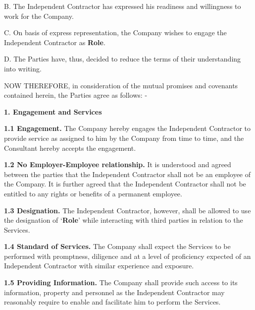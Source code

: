 \documentclass[12pt]{article}
\begin{document}
\vspace{0.5em}
\noindent
B. The Independent Contractor has expressed his readiness and willingness to work for the Company.

\vspace{0.5em}
\noindent
C. On basis of express representation, the Company wishes to engage the Independent Contractor as \textbf{{{Role}}}.

\vspace{0.5em}
\noindent
D. The Parties have, thus, decided to reduce the terms of their understanding into writing.

\vspace{1em}
\noindent
NOW THEREFORE, in consideration of the mutual promises and covenants contained herein, the Parties agree as follows: -

\vspace{1em}
\noindent
\textbf{1. Engagement and Services}

\vspace{0.5em}
\noindent
\textbf{1.1 Engagement.} The Company hereby engages the Independent Contractor to provide service as assigned to him by the Company from time to time, and the Consultant hereby accepts the engagement.

\vspace{0.5em}
\noindent
\textbf{1.2 No Employer-Employee relationship.} It is understood and agreed between the parties that the Independent Contractor shall not be an employee of the Company. It is further agreed that the Independent Contractor shall not be entitled to any rights or benefits of a permanent employee.

\vspace{0.5em}
\noindent
\textbf{1.3 Designation.} The Independent Contractor, however, shall be allowed to use the designation of `\textbf{{{Role}}}' while interacting with third parties in relation to the Services.

\vspace{0.5em}
\noindent
\textbf{1.4 Standard of Services.} The Company shall expect the Services to be performed with promptness, diligence and at a level of proficiency expected of an Independent Contractor with similar experience and exposure.

\vspace{0.5em}
\noindent
\textbf{1.5 Providing Information.} The Company shall provide such access to its information, property and personnel as the Independent Contractor may reasonably require to enable and facilitate him to perform the Services.
\end{document}
